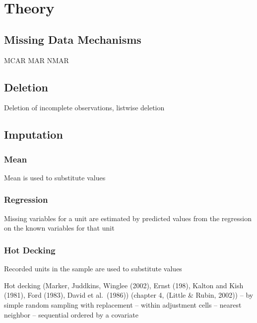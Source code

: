 \documentclass[12pt,econ]{sources/authesis}
\begin{document}
\hypertarget{ordmiss-theory}{%
\section{Theory}\label{ordmiss-theory}}

\hypertarget{ordmiss-theory-mechanisms}{%
\subsection{Missing Data Mechanisms}\label{ordmiss-theory-mechanisms}}

MCAR
MAR
NMAR

\hypertarget{ordmiss-theory-delete}{%
\subsection{Deletion}\label{ordmiss-theory-delete}}

Deletion of incomplete observations, listwise deletion

\hypertarget{ordmiss-theory-impute}{%
\subsection{Imputation}\label{ordmiss-theory-impute}}

\hypertarget{ordmiss-theory-impute-mean}{%
\subsubsection{Mean}\label{ordmiss-theory-impute-mean}}

Mean is used to substitute values

\hypertarget{ordmiss-theory-impute-regress}{%
\subsubsection{Regression}\label{ordmiss-theory-impute-regress}}

Missing variables for a unit are estimated by predicted values from the regression on the known variables for that unit

\hypertarget{ordmiss-theory-impute-hd}{%
\subsubsection{Hot Decking}\label{ordmiss-theory-impute-hd}}

Recorded units in the sample are used to substitute values

Hot decking (Marker, Juddkins, Winglee (2002), Ernst (198), Kalton and Kish (1981), Ford (1983), David et al.~(1986)) (chapter 4, (Little \& Rubin, 2002))
-- by simple random sampling with replacement
-- within adjustment cells
-- nearest neighbor
-- sequential ordered by a covariate
\end{document}
